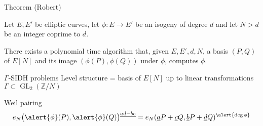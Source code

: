 \documentclass[aspectratio=169]{beamer}
\newcommand{\GL}{\operatorname{GL}}
\begin{document}

\begin{frame}{Theorem (Robert)}
  \large\centering
  \begin{minipage}{0.8\linewidth}
    Let $E,E'$ be elliptic curves, let \emph{$\phi:E\to E'$} be an
    isogeny of degree \emph{$d$} and let \emph{$N>d$} be an integer
    coprime to $d$.
    
    \bigskip
    
    There exists a polynomial time algorithm that, given
    \emph{$E,E',d,N$}, a basis \emph{$(P,Q)$} of \emph{$E[N]$} and its
    image \emph{$(\phi(P),\phi(Q))$} under $\phi$, computes $\phi$.
  \end{minipage}
\end{frame}


\begin{frame}{$Γ$-SIDH problems}
  \centering
  \large
  Level structure = basis of $E[N]$ up to linear transformations $Γ ⊂ \GL_2(ℤ/N)$

  \vspace{3em}  
  \Large
\end{frame}


\begin{frame}{Weil pairing}
  \Large
  \[e_N\bigl(\alert{\phi}(P), \alert{\phi}(Q)\bigr)^{\emph{ad-bc}} =
    e_N(\emph{a}P+\emph{c}Q,\emph{b}P+\emph{d}Q)^{\alert{\deg\phi}}\]
\end{frame}

\end{document}
